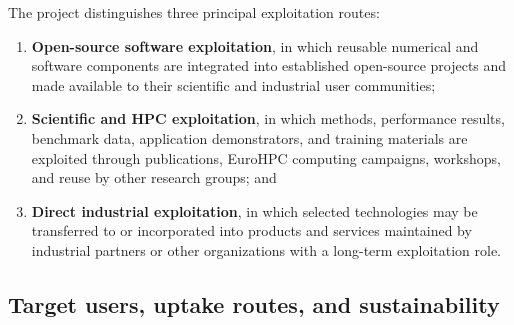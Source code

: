 \documentclass[a4paper,12pt]{article}
\begin{document}
The project distinguishes three principal exploitation routes:
\begin{enumerate}
  \item \textbf{Open-source software exploitation}, in which reusable
  numerical and software components are integrated into established
  open-source projects and made available to their scientific and industrial
  user communities;
  \item \textbf{Scientific and HPC exploitation}, in which methods,
  performance results, benchmark data, application demonstrators, and
  training materials are exploited through publications, EuroHPC computing
  campaigns, workshops, and reuse by other research groups; and
  \item \textbf{Direct industrial exploitation}, in which selected
  technologies may be transferred to or incorporated into products and
  services maintained by industrial partners or other organizations with a
  long-term exploitation role.
\end{enumerate}

\subsection{Target users, uptake routes, and sustainability}
\end{document}
